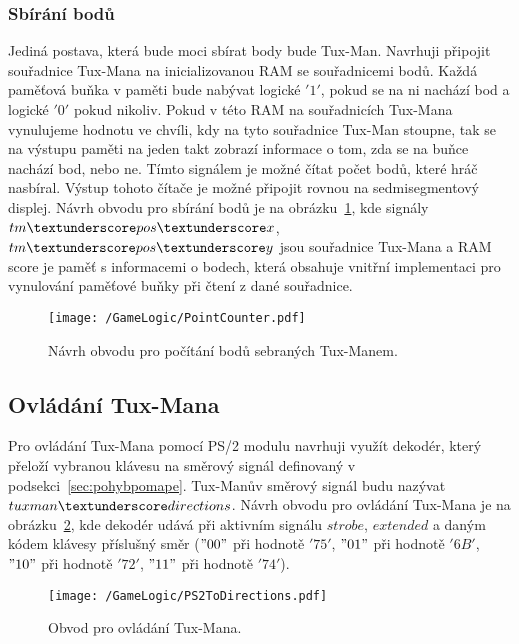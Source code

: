 \documentclass{report}
\begin{document}
\subsubsection{Sbírání bodů}
Jediná postava, která bude moci sbírat body bude Tux-Man. Navrhuji připojit souřadnice Tux-Mana na inicializovanou RAM se souřadnicemi bodů. Každá paměťová buňka v paměti bude nabývat logické $'1'$, pokud se na ni nachází bod a logické $'0'$ pokud nikoliv. Pokud v této RAM na souřadnicích Tux-Mana vynulujeme hodnotu ve chvíli, kdy na tyto souřadnice Tux-Man stoupne, tak se na výstupu paměti na jeden takt zobrazí informace o tom, zda se na buňce nachází bod, nebo ne. Tímto signálem je možné čítat počet bodů, které hráč nasbíral. Výstup tohoto čítače je možné připojit rovnou na sedmisegmentový displej. Návrh obvodu pro sbírání bodů je na obrázku~\ref{fig:pointcounting}, kde signály $tm\textunderscore pos\textunderscore x$, $tm\textunderscore pos\textunderscore y$ jsou souřadnice Tux-Mana a RAM score je paměť s informacemi o bodech, která obsahuje vnitřní implementaci pro vynulování paměťové buňky při čtení z dané souřadnice. 
\begin{figure}
\centering
\texttt{[image: /GameLogic/PointCounter.pdf]}
\caption{Návrh obvodu pro počítání bodů sebraných Tux-Manem.}
\label{fig:pointcounting}
\end{figure}
\subsection{Ovládání Tux-Mana}\label{sec:ovladanipostavy}
Pro ovládání Tux-Mana pomocí PS/2 modulu navrhuji využít dekodér, který přeloží vybranou klávesu na směrový signál definovaný v podsekci~\ref{sec:pohybpomape}. Tux-Manův směrový signál budu nazývat $tuxman\textunderscore directions$. Návrh obvodu pro ovládání Tux-Mana je na obrázku~\ref{fig:tuxcontrol}, kde dekodér udává při aktivním signálu $strobe$, $extended$ a daným kódem klávesy příslušný směr ($"00"$ při hodnotě $'75'$, $"01"$ při hodnotě $'6B'$, $"10"$ při hodnotě $'72'$, $"11"$ při hodnotě $'74'$).
\begin{figure}
\centering
\texttt{[image: /GameLogic/PS2ToDirections.pdf]}
\caption{Obvod pro ovládání Tux-Mana.}
\label{fig:tuxcontrol}
\end{figure}
\end{document}
